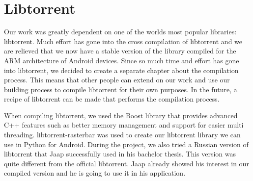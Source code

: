 \section{Libtorrent}
	Our work was greatly dependent on one of the worlds most popular libraries: libtorrent. Much effort has gone into the cross compilation of libtorrent and we are relieved that we now have a stable version of the library compiled for the ARM architecture of Android devices. Since so much time and effort has gone into libtorrent, we decided to create a separate chapter about the compilation process. This means that other people can extend on our work and use our building process to compile libtorrent for their own purposes. In the future, a recipe of libtorrent can be made that performs the compilation process.
	
	When compiling libtorrent, we used the Boost library that provides advanced C++ features such as better memory management and support for easier multi threading. libtorrent-rasterbar was used to create our libtorrent library we can use in Python for Android. During the project, we also tried a Russian version of libtorrent that Jaap successfully used in his bachelor thesis. This version was quite different from the official libtorrent. Jaap already showed his interest in our compiled version and he is going to use it in his application.